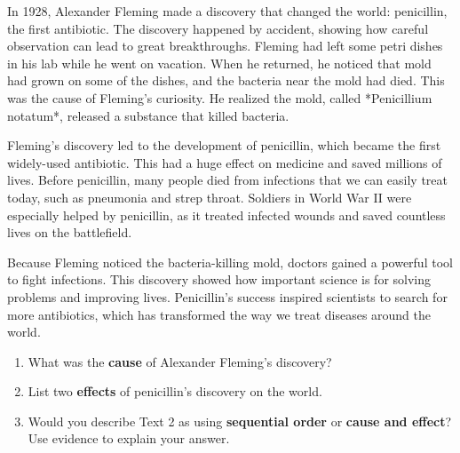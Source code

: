 \documentclass[12pt]{article}
\begin{document}
\begin{tcolorbox}[colframe=black!60, colback=white, 
coltitle=black, colbacktitle=black!15, fonttitle=\bfseries\Large, 
title=Text 4: The Discovery of Penicillin, halign title=center, left=10pt, right=10pt, top=10pt, bottom=15pt]
In 1928, Alexander Fleming made a discovery that changed the world: penicillin, the first antibiotic. The discovery happened by accident, showing how careful observation can lead to great breakthroughs. Fleming had left some petri dishes in his lab while he went on vacation. When he returned, he noticed that mold had grown on some of the dishes, and the bacteria near the mold had died. This was the cause of Fleming’s curiosity. He realized the mold, called *Penicillium notatum*, released a substance that killed bacteria.

Fleming’s discovery led to the development of penicillin, which became the first widely-used antibiotic. This had a huge effect on medicine and saved millions of lives. Before penicillin, many people died from infections that we can easily treat today, such as pneumonia and strep throat. Soldiers in World War II were especially helped by penicillin, as it treated infected wounds and saved countless lives on the battlefield.

Because Fleming noticed the bacteria-killing mold, doctors gained a powerful tool to fight infections. This discovery showed how important science is for solving problems and improving lives. Penicillin’s success inspired scientists to search for more antibiotics, which has transformed the way we treat diseases around the world.
\end{tcolorbox}

\begin{tcolorbox}[colframe=black!60, colback=white, 
coltitle=black, colbacktitle=black!15, fonttitle=\bfseries\Large, 
title=Independent Practice, halign title=center, left=10pt, right=10pt, top=10pt, bottom=15pt]
\begin{enumerate}[itemsep=4em]
    \item What was the \textbf{cause} of Alexander Fleming’s discovery?
    \item List two \textbf{effects} of penicillin’s discovery on the world.
    \item Would you describe Text 2 as using \textbf{sequential order} or \textbf{cause and effect}? Use evidence to explain your answer.
\\[1em] \underline{\hspace{15cm}}
    \\[1em] \underline{\hspace{15cm}}
    \\[1em] \underline{\hspace{15cm}}
\end{enumerate}
\end{tcolorbox}
\end{document}
